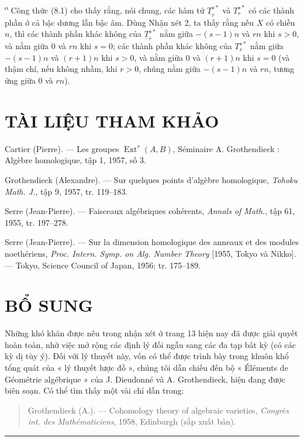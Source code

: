 \medskip
{}\textsuperscript{o} Công thức (8.1) cho thấy rằng, nói chung, các
hàm tử $\underline{T}_{r}^{s*}$ và $T_{r}^{s*}$ có các thành phần ở cả bậc
dương lẫn bậc âm. Dùng Nhận xét 2, ta thấy rằng nếu $X$ có chiều $n$, thì các
thành phần khác không của $\underline{T}_{r}^{s*}$ nằm giữa $-(s-1)n$ và $rn$
khi $s>0$, và nằm giữa $0$ và $rn$ khi $s=0$; các thành phần khác không của
$T_{r}^{s*}$ nằm giữa $-(s-1)n$ và $(r+1)n$ khi $s>0$, và nằm giữa $0$ và
$(r+1)n$ khi $s=0$ (và thậm chí, nếu không nhầm, khi $r>0$, chúng nằm giữa
$-(s-1)n$ và $rn$, tương ứng giữa $0$ và $rn$).

\section*{TÀI LIỆU THAM KHẢO}

\noindent[1] Cartier (Pierre). --- Les groupes
$\operatorname{Ext}^{s}(A,B)$, Séminaire A. Grothendieck : Algèbre homologique,
tập 1, 1957, số 3.

\noindent[2] Grothendieck (Alexandre). --- Sur quelques points d'algèbre
homologique, \emph{Tohoku Math. J.}, tập 9, 1957, tr. 119--183.

\noindent[3] Serre (Jean-Pierre). --- Faisceaux algébriques cohérents,
\emph{Annals of Math.}, tập 61, 1955, tr. 197--278.

\noindent[4] Serre (Jean-Pierre). --- Sur la dimension homologique des anneaux
et des modules noethériens, \emph{Proc. Intern. Symp. on Alg. Number Theory}
[1955, Tokyo và Nikko]. --- Tokyo, Science Council of Japan, 1956;
tr. 175--189.

\clearpage

\section*{BỔ SUNG}

Những khó khăn được nêu trong nhận xét ở trang 13 hiện nay đã được giải quyết
hoàn toàn, nhờ việc mở rộng các định lý đối ngẫu sang các đa tạp bất kỳ
(có các kỳ dị tùy ý). Đối với lý thuyết này, vốn có thể được trình bày trong
khuôn khổ tổng quát của « lý thuyết lược đồ », chúng tôi dẫn chiếu đến bộ
« Éléments de Géométrie algébrique » của J. Dieudonné và A. Grothendieck,
hiện đang được biên soạn. Có thể tìm thấy một vài chỉ dẫn trong:

\begin{quote}
Grothendieck (A.). --- Cohomology theory of algebraic varieties,
\emph{Congrès int. des Mathématiciens}, 1958, Edinburgh (sắp xuất bản).
\end{quote}

\begin{flushright}
\end{flushright}

\begin{center}\rule{36mm}{0.5pt}\end{center}
